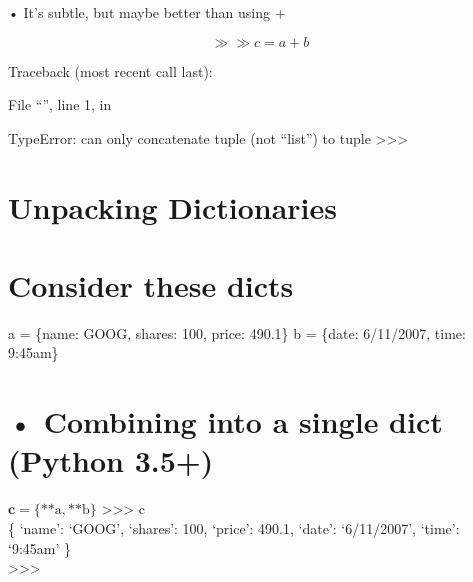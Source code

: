 \documentclass[
  letterpaper,
  DIV=11,
  numbers=noendperiod]{scrreprt}
\newenvironment{Shaded}{\begin{snugshade}}{\end{snugshade}}
\newcommand{\DecValTok}[1]{\textcolor[rgb]{0.68,0.00,0.00}{#1}}
\newcommand{\FloatTok}[1]{\textcolor[rgb]{0.68,0.00,0.00}{#1}}
\newcommand{\NormalTok}[1]{\textcolor[rgb]{0.00,0.23,0.31}{#1}}
\newcommand{\OperatorTok}[1]{\textcolor[rgb]{0.37,0.37,0.37}{#1}}
\newcommand{\StringTok}[1]{\textcolor[rgb]{0.13,0.47,0.30}{#1}}
\begin{document}
• It's subtle, but maybe better than using +

\[
\gg \gg c = a + b
\]

Traceback (most recent call last):

File ``'', line 1, in

TypeError: can only concatenate tuple (not ``list'') to tuple
\textgreater\textgreater\textgreater{}


\chapter{Unpacking Dictionaries}\label{unpacking-dictionaries}


\chapter{Consider these dicts}\label{consider-these-dicts}

\begin{Shaded}
\begin{Highlighting}[]
\NormalTok{a }\OperatorTok{=}\NormalTok{ \{}\StringTok{\textquotesingle{}name\textquotesingle{}}\NormalTok{: }\StringTok{\textquotesingle{}GOOG\textquotesingle{}}\NormalTok{, }\StringTok{\textquotesingle{}shares\textquotesingle{}}\NormalTok{: }\DecValTok{100}\NormalTok{, }\StringTok{\textquotesingle{}price\textquotesingle{}}\NormalTok{: }\FloatTok{490.1}\NormalTok{\}  }
\NormalTok{b }\OperatorTok{=}\NormalTok{ \{}\StringTok{\textquotesingle{}date\textquotesingle{}}\NormalTok{: }\StringTok{\textquotesingle{}6/11/2007\textquotesingle{}}\NormalTok{, }\StringTok{\textquotesingle{}time\textquotesingle{}}\NormalTok{: }\StringTok{\textquotesingle{}9:45am\textquotesingle{}}\NormalTok{\} }
\end{Highlighting}
\end{Shaded}


\chapter{• Combining into a single dict (Python
3.5+)}\label{combining-into-a-single-dict-python-3.5}

\(\mathbf{c} = \{\text{**a}, \text{**b}\}\)
\textgreater\textgreater\textgreater{} c\\
\{ `name': `GOOG', `shares': 100, `price': 490.1, `date': `6/11/2007',
`time': `9:45am' \}\\
\textgreater\textgreater\textgreater{}
\end{document}
